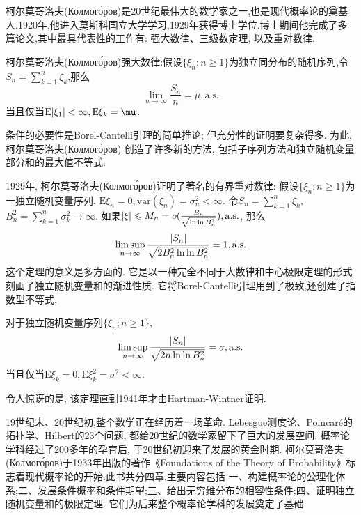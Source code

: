 柯尔莫哥洛夫(Колмого́ров)是20世纪最伟大的数学家之一,也是现代概率论的奠基人.1920年,他进入莫斯科国立大学学习,1929年获得博士学位.博士期间他完成了多篇论文,其中最具代表性的工作有: 强大数律、三级数定理, 以及重对数律.

柯尔莫哥洛夫(Колмого́ров)强大数律:假设$\{\xi_n;n\geqslant 1\}$为独立同分布的随机序列,令$S_n =\sum_{k=1}^n\xi_k$,那么\begin{equation}
\lim_{n\to\infty}\frac{S_n}{n} = \mu,\mathrm{a.s.}
\end{equation}
当且仅当$\mathrm{E}\abs{\xi_1}<\infty,\mathrm{E}\xi_k = \mu$.

条件的必要性是Borel-Cantelli引理的简单推论; 但充分性的证明要复杂得多. 为此, 柯尔莫哥洛夫(Колмого́ров)
创造了许多新的方法, 包括子序列方法和独立随机变量部分和的最大值不等式.

1929年, 柯尔莫哥洛夫(Колмого́ров)证明了著名的有界重对数律:
假设$\{\xi_n;n\geqslant 1\}$为一独立随机变量序列. $\mathrm{E}\xi_n = 0,\mathrm{var}(\xi_n) = \sigma^2_n<\infty$. 令$S_n = \sum_{k=1}^n\xi_k$, $B_n^2 = \sum_{k=1}^n\sigma_k^2\to\infty$. 如果$\lvert\xi\rvert\leqslant M_n = o(\frac{B_n}{\sqrt{\ln\ln B_n^2}}),\mathrm{a.s.}$, 那么\begin{equation}
\limsup_{n\to\infty}\frac{\lvert S_n\rvert}{\sqrt{2B_n^2\ln\ln B_n^2}} = 1,\mathrm{a.s.}
\end{equation}
这个定理的意义是多方面的. 它是以一种完全不同于大数律和中心极限定理的形式刻画了独立随机变量和的渐进性质. 它将Borel-Cantelli引理用到了极致,还创建了指数型不等式.

对于独立随机变量序列$\{\xi_n;n\geqslant 1\}$,\begin{equation}
\limsup_{n\to\infty}\frac{\lvert S_n\rvert}{\sqrt{2n\ln\ln B_n^2}} = \sigma,\mathrm{a.s.}
\end{equation}
当且仅当$\mathrm{E}\xi_k = 0,\mathrm{E}\xi_k^2 = \sigma^2<\infty$.

令人惊讶的是, 该定理直到1941年才由Hartman-Wintner证明.

19世纪末、20世纪初,整个数学正在经历着一场革命. Lebesgue测度论、Poincaré的拓扑学、Hilbert的23个问题, 都给20世纪的数学家留下了巨大的发展空间. 概率论学科经过了200多年的孕育后, 于20世纪初迎来了发展的黄金时期. 柯尔莫哥洛夫(Колмого́ров)于1933年出版的著作《Foundations of the Theory of Probability》标志着现代概率论的开始.此书共分四章,主要内容包括
一、构建概率论的公理化体系;二、发展条件概率和条件期望;三、给出无穷维分布的相容性条件;四、证明独立随机变量和的极限定理. 它们为后来整个概率论学科的发展奠定了基础.

